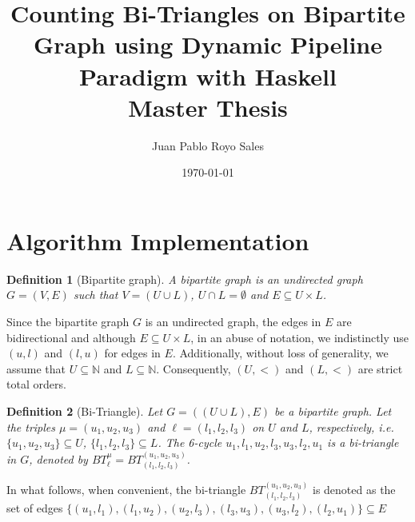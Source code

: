 \documentclass[12pt, a4paper]{article}
\title{%
      Counting Bi-Triangles on Bipartite Graph using Dynamic Pipeline Paradigm with Haskell\\
      Master Thesis
}
\author{Juan Pablo Royo Sales}
\affil{Universitat Politècnica de Catalunya}
\date\today
\newcommand{\bti}{BT_{(l_1, l_2,l_3)}^{(u_1, u_2, u_3)}}
\newtheorem{definition}{Definition}
\begin{document}


\section{Algorithm Implementation}

\begin{definition}[Bipartite graph] 
A bipartite graph is an undirected graph $G=(V,E)$  such that $V=(U\cup L)$, $U\cap L=\emptyset$ and $E\subseteq U\times L$.
\end{definition}

Since the bipartite graph $G$ is an undirected graph, the edges in $E$ are bidirectional and although $E\subseteq U\times L$, in an abuse of notation, we indistinctly use $(u,l)$ and $(l,u)$ for edges in $E$. Additionally, 
without loss of generality, we assume that  $U\subseteq \mathbb{N}$ and $L\subseteq \mathbb{N}$. Consequently, $(U,<)$  and $(L,<)$ are strict total orders. 

%
\begin{definition}[Bi-Triangle]
Let $G=((U\cup L),E)$ be a bipartite graph. Let the triples $\mu=(u_1, u_2, u_3)$ and $\ell=(l_1, l_2,l_3)$ on $U$ and $L$, respectively, i.e.  $\{u_1, u_2, u_3\} \subseteq U$, $\{l_1, l_2,l_3\} \subseteq L$. 
The 6-cycle $u_1,l_1,u_2,l_3,u_3,l_2,u_1$  is a \textit{bi-triangle} in $G$, denoted by $BT_{\ell}^{\mu} = \bti$. 
\end{definition}

In what follows, when convenient, the bi-triangle $BT_{(l_1,l_2,l_3)}^{(u_1,u_2,u_3)}$  is denoted as the set of edges $\{(u_1, l_1), (l_1,u_2), (u_2, l_3), (l_3,u_3), (u_3, l_2), (l_2,u_1)\} \subseteq E$
\end{document}

